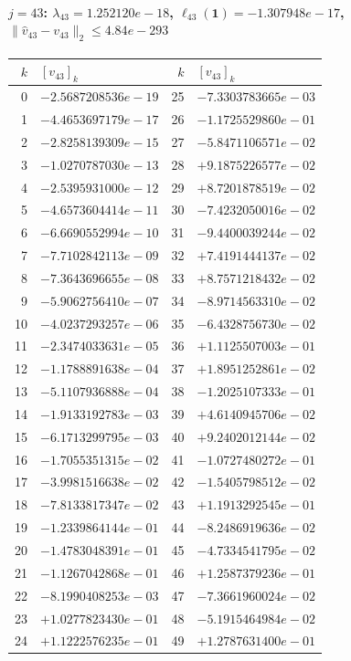 \paragraph{$j = 43$: $\lambda_{43} = 1.252120e-18$, \quad $\ell_{43}(\mathbf{1}) = -1.307948e-17$, \quad $\|\hat{v}_{43} - v_{43}\|_2 \leq 4.84e-293$}
\begin{center}
{\footnotesize
\begin{tabular}{r@{\;\;}l@{\quad}r@{\;\;}l}
\toprule
$k$ & $[v_{43}]_k$ & $k$ & $[v_{43}]_k$ \\
\midrule
0 & $-2.5687208536e-19$ & 25 & $-7.3303783665e-03$ \\
1 & $-4.4653697179e-17$ & 26 & $-1.1725529860e-01$ \\
2 & $-2.8258139309e-15$ & 27 & $-5.8471106571e-02$ \\
3 & $-1.0270787030e-13$ & 28 & $+9.1875226577e-02$ \\
4 & $-2.5395931000e-12$ & 29 & $+8.7201878519e-02$ \\
5 & $-4.6573604414e-11$ & 30 & $-7.4232050016e-02$ \\
6 & $-6.6690552994e-10$ & 31 & $-9.4400039244e-02$ \\
7 & $-7.7102842113e-09$ & 32 & $+7.4191444137e-02$ \\
8 & $-7.3643696655e-08$ & 33 & $+8.7571218432e-02$ \\
9 & $-5.9062756410e-07$ & 34 & $-8.9714563310e-02$ \\
10 & $-4.0237293257e-06$ & 35 & $-6.4328756730e-02$ \\
11 & $-2.3474033631e-05$ & 36 & $+1.1125507003e-01$ \\
12 & $-1.1788891638e-04$ & 37 & $+1.8951252861e-02$ \\
13 & $-5.1107936888e-04$ & 38 & $-1.2025107333e-01$ \\
14 & $-1.9133192783e-03$ & 39 & $+4.6140945706e-02$ \\
15 & $-6.1713299795e-03$ & 40 & $+9.2402012144e-02$ \\
16 & $-1.7055351315e-02$ & 41 & $-1.0727480272e-01$ \\
17 & $-3.9981516638e-02$ & 42 & $-1.5405798512e-02$ \\
18 & $-7.8133817347e-02$ & 43 & $+1.1913292545e-01$ \\
19 & $-1.2339864144e-01$ & 44 & $-8.2486919636e-02$ \\
20 & $-1.4783048391e-01$ & 45 & $-4.7334541795e-02$ \\
21 & $-1.1267042868e-01$ & 46 & $+1.2587379236e-01$ \\
22 & $-8.1990408253e-03$ & 47 & $-7.3661960024e-02$ \\
23 & $+1.0277823430e-01$ & 48 & $-5.1915464984e-02$ \\
24 & $+1.1222576235e-01$ & 49 & $+1.2787631400e-01$ \\
\bottomrule
\end{tabular}
}
\end{center}

